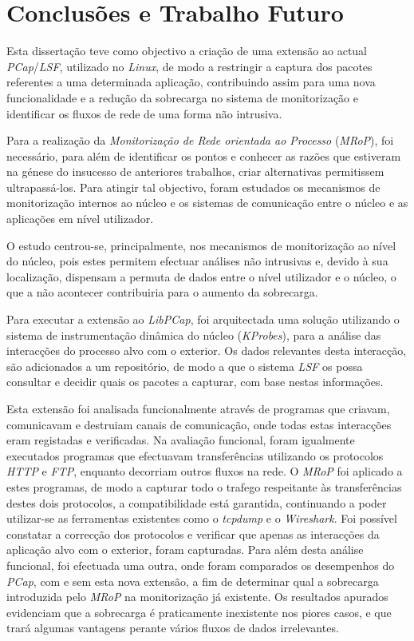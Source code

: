 \chapter{Conclusões e Trabalho Futuro}
\label{cap:conclusao}

Esta dissertação teve como objectivo a criação de uma extensão ao actual \textit{PCap}/\textit{LSF}, utilizado no \textit{Linux}, de modo a restringir a captura dos pacotes referentes a uma determinada aplicação, contribuindo assim para uma nova funcionalidade e a redução da sobrecarga no sistema de monitorização e identificar os fluxos de rede de uma forma não intrusiva.

Para a realização da \textit{Monitorização de Rede orientada ao Processo} (\textit{MRoP}), foi necessário, para além de identificar os pontos e conhecer as razões que estiveram na génese do insucesso de anteriores trabalhos, criar alternativas permitissem ultrapassá-los.
Para atingir tal objectivo, foram estudados os mecanismos de monitorização internos ao núcleo e os sistemas de comunicação entre o núcleo e as aplicações em nível utilizador.

O estudo centrou-se, principalmente, nos mecanismos de monitorização ao nível do núcleo, pois estes permitem efectuar análises não intrusivas e, devido à sua localização, dispensam a permuta de dados entre o nível utilizador e o núcleo, o que a não acontecer contribuiria para o aumento da sobrecarga.

Para executar a extensão ao \textit{LibPCap}, foi arquitectada uma solução utilizando o sistema de instrumentação dinâmica do núcleo (\textit{KProbes}), para a análise das interacções do processo alvo com o exterior.
Os dados relevantes desta interacção, são adicionados a um repositório, de modo a que o sistema \textit{LSF} os possa consultar e decidir quais os pacotes a capturar, com base nestas informações.

Esta extensão foi analisada funcionalmente através de programas que criavam, comunicavam e destruiam canais de comunicação, onde todas estas interacções eram registadas e verificadas.
Na avaliação funcional, foram igualmente executados programas que efectuavam transferências utilizando os protocolos \textit{HTTP} e \textit{FTP}, enquanto decorriam outros fluxos na rede. 
O \textit{MRoP} foi aplicado a estes programas, de modo a capturar todo o trafego respeitante às transferências destes dois protocolos, a compatibilidade está garantida, continuando a poder utilizar-se as ferramentas existentes como o \textit{tcpdump} e o \textit{Wireshark}.
Foi possível constatar a correcção dos protocolos e verificar que apenas as interacções da aplicação alvo com o exterior, foram capturadas.
Para além desta análise funcional, foi efectuada uma outra, onde foram comparados os desempenhos do \textit{PCap}, com e sem esta nova extensão, a fim de determinar qual a sobrecarga introduzida pelo \textit{MRoP} na monitorização já existente.
Os resultados apurados evidenciam que a sobrecarga é praticamente inexistente nos piores casos, e que trará algumas vantagens perante vários fluxos de dados irrelevantes.

